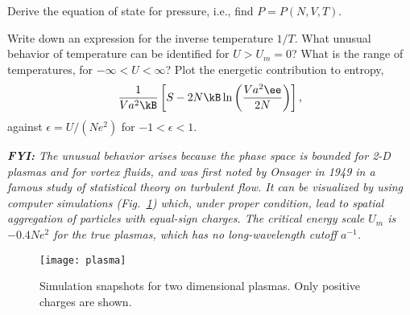 \smallskip\subp
Derive the equation of state for pressure, i.e., find $P=P(N,V,T)$.

\smallskip\subp
Write down an expression for the inverse temperature $1/T$.
What unusual behavior of temperature can be identified for $U > U_m = 0$?
What is the range of temperatures, for $-\infty < U < \infty$?
Plot the energetic contribution to entropy,
$$ \frac{1}{Va^2 \kB} \left[S - 2N\kB \ln\left(\frac{Va^2\ee}{2N}\right)\right], $$
against $\epsilon=U/(Ne^2)$ for $-1 < \epsilon < 1$.
\hfil\break
\strut\hfil\break
{\sl {\bf FYI:} The unusual behavior arises because the phase space is
bounded for 2-D plasmas and for vortex fluids,
and was first noted by Onsager in 1949
in a famous study of statistical theory on turbulent flow.
It can be visualized by using computer simulations (Fig.~\ref{fig:plasma}) which,
under proper condition, lead to spatial aggregation of particles with equal-sign charges.
The critical energy scale $U_m$ is $-0.4 Ne^2$ for the true plasmas,
which has no long-wavelength cutoff $a^{-1}$.
}

\begin{figure}[h]\centering
\texttt{[image: plasma]}
\caption{
Simulation snapshots for two dimensional plasmas.
Only positive charges are shown.
\label{fig:plasma}}
\end{figure}
\fi
